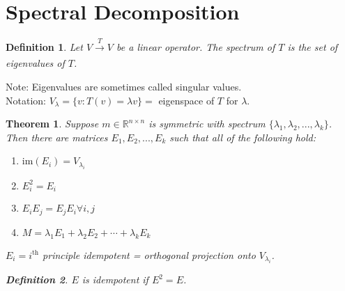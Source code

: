 \documentclass{report}
\newtheorem*{defn}{Definition}
\newtheorem*{thrm}{Theorem}
\begin{document}
\section{Spectral Decomposition}
\begin{defn}
Let $V\xrightarrow[]{T} V$ be a linear operator. The spectrum of $T$ is the set of eigenvalues of $T$.
\end{defn}
Note: Eigenvalues are sometimes called singular values.\\
Notation: $V_\lambda = \{v: T(v) = \lambda v\} =$ eigenspace of $T$ for $\lambda$.
\begin{thrm}
Suppose $m\in \mathbb{R}^{n\times n}$ is symmetric with spectrum $\{\lambda_1, \lambda_2, ..., \lambda_k\}$. Then there are matrices $E_1,E_2,...,E_k$ such that all of the following hold:
\begin{enumerate}
\item[(i)]$\mathrm{im}(E_i)=V_{\lambda_i}$
\item[(ii)]$E_i^2 = E_i$
\item[(iii)]$E_iE_j=E_jE_i \forall i,j$
\item[(iv)]$M=\lambda_1E_1+\lambda_2E_2+\cdots +\lambda_kE_k$
\end{enumerate}
$E_i = i^{\mathrm{th}}$ principle idempotent = orthogonal projection onto $V_{\lambda_i}$.
\begin{defn}
$E$ is idempotent if $E^2=E$.
\end{defn}
\end{thrm}
\end{document}
